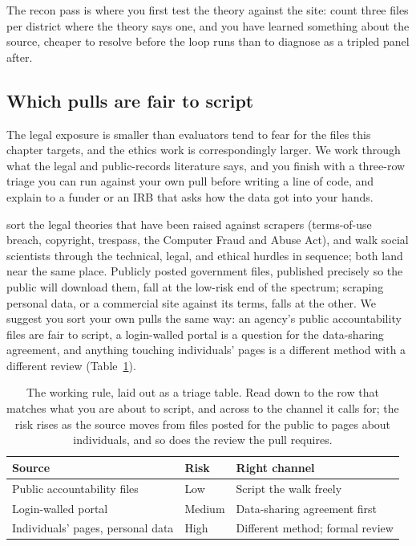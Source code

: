 The recon pass is where you first test the theory against the site: count three files per district where the theory says one, and you have learned something about the source, cheaper to resolve before the loop runs than to diagnose as a tripled panel after.

\subsection{Which pulls are fair to script}\label{sec:ch04-legalrisk}
The legal exposure is smaller than evaluators tend to fear for the files this chapter targets, and the ethics work is correspondingly larger. We work through what the legal and public-records literature says, and you finish with a three-row triage you can run against your own pull before writing a line of code, and explain to a funder or an IRB that asks how the data got into your hands.

\textcite{krotov2020legality} sort the legal theories that have been raised against scrapers (terms-of-use breach, copyright, trespass, the Computer Fraud and Abuse Act), and \textcite{luscombe2022scraping} walk social scientists through the technical, legal, and ethical hurdles in sequence; both land near the same place. Publicly posted government files, published precisely so the public will download them, fall at the low-risk end of the spectrum; scraping personal data, or a commercial site against its terms, falls at the other. We suggest you sort your own pulls the same way: an agency's public accountability files are fair to script, a login-walled portal is a question for the data-sharing agreement, and anything touching individuals' pages is a different method with a different review (Table~\ref{tab:ch04-viz-risk}).

\begin{table}[htbp]
\centering
\caption[Which channel for which source]{The working rule, laid out as a triage table. Read down to the row that matches what you are
about to script, and across to the channel it calls for; the risk rises
as the source moves from files posted for the public to pages about
individuals, and so does the review the pull requires.}
\label{tab:ch04-viz-risk}
\begin{tabular}{@{}p{4.2cm}p{1.8cm}p{8.8cm}@{}}
\toprule
Source & Risk & Right channel \\
\midrule
Public accountability files & Low & Script the walk freely \\
Login-walled portal & Medium & Data-sharing agreement first \\
Individuals' pages, personal data & High & Different method; formal review \\
\bottomrule
\end{tabular}
\end{table}

